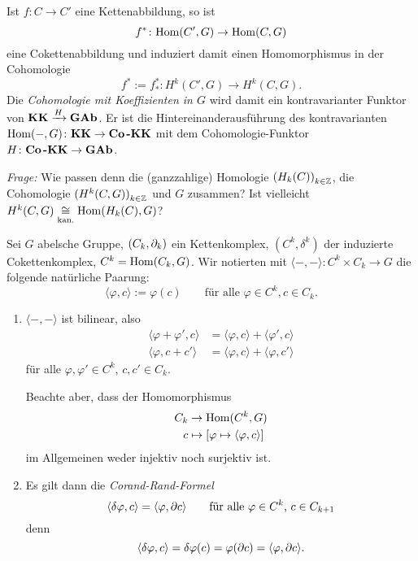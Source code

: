 \begin{kommentar}
  Ist $f\colon C \to C'$ eine Kettenabbildung, so ist
  \begin{equation*}
    f^*\colon \mathrm{Hom}(C',G) \to \mathrm{Hom}(C,G)
  \end{equation*}
  eine Cokettenabbildung und induziert damit einen Homomorphismus in der Cohomologie
  \begin{equation*}
    f^* := f_*^* \colon H^k(C',G) \to H^k(C,G).
  \end{equation*}
  Die \emph{Cohomologie mit Koeffizienten in $G$} wird damit ein kontravarianter Funktor von $\mathbf{KK} \xrightarrow{H} \mathbf{GAb}$.
  Er ist die Hintereinanderausführung des kontravarianten $\mathrm{Hom}(-,G)\colon \mathbf{KK} \to \mathbf{Co\kern1.5pt\text{\textbf{-}}KK}$ mit dem Cohomologie-Funktor $H\colon \mathbf{Co\kern1.5pt\text{\textbf{-}}KK} \to \mathbf{GAb}$.
\end{kommentar}
\emph{Frage:} Wie passen denn die (ganzzahlige) Homologie ${(H_k(C))}_{k\in\mathbb{Z}}$, die Cohomologie ${(H^k(C,G))}_{k\in\mathbb{Z}}$ und $G$ zusammen?
Ist vielleicht $H^k(C,G) \underset{\text{kan.}}{\cong} \mathrm{Hom}(H_k(C),G)$?
\begin{defn}
  Sei $G$ abelsche Gruppe, $(C_k,\partial_k)$ ein Kettenkomplex, $(C^k,\delta^k)$ der induzierte Cokettenkomplex, $C^k = \mathrm{Hom}(C_k,G)$.
  Wir notierten mit $\langle -,- \rangle \colon C^k \times C_k \to G$ die folgende natürliche Paarung:
  \begin{equation*}
    \langle \varphi,c \rangle := \varphi(c) \qquad \text{für alle } \varphi\in C^k, c \in C_k.
  \end{equation*}
\end{defn}
\begin{kommentar}
  \begin{enumerate}
    \item
      $\langle -,- \rangle$ ist bilinear, also
      \begin{align*}
        \langle \varphi+\varphi', c \rangle & = \langle \varphi, c \rangle + \langle \varphi',c \rangle \\
        \langle \varphi, c+c' \rangle & = \langle \varphi, c \rangle + \langle \varphi,c' \rangle
      \end{align*}
      für alle $\varphi,\varphi' \in C^k$, $c,c' \in C_k$.

      Beachte aber, dass der Homomorphismus
      \begin{align*}
        C_k & \to \mathrm{Hom}(C^k,G)\\
        c   & \mapsto [ \varphi \mapsto \langle \varphi, c \rangle ]
      \end{align*}
      im Allgemeinen weder injektiv noch surjektiv ist.
    \item
      Es gilt dann die \emph{Corand-Rand-Formel}
      \begin{equation*}
        \langle \delta\varphi,c \rangle = \langle \varphi, \partial c \rangle \qquad \text{für alle $\varphi \in C^k$, $c \in C_{k+1}$}
      \end{equation*}
      denn
      \begin{equation*}
        \langle \delta\varphi, c \rangle = \delta \varphi (c) = \varphi (\partial c) = \langle \varphi, \partial c \rangle.
      \end{equation*}
  \end{enumerate}
\end{kommentar}
